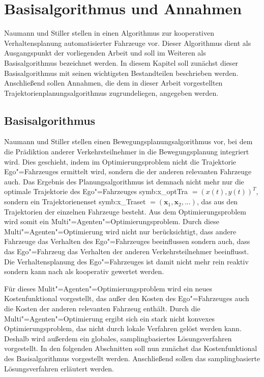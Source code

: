 
\chapter{Basisalgorithmus und Annahmen}
\label{sec:underlying-conditions_preliminaries}
Naumann und Stiller stellen in \cite{Naumann2017towards} einen Algorithmus zur kooperativen Verhaltensplanung automatisierter Fahrzeuge vor.
Dieser Algorithmus dient als Ausgangspunkt der vorliegenden Arbeit und soll im Weiteren als Basisalgorithmus bezeichnet werden.
In diesem Kapitel soll zun\"achst dieser Basisalgorithmus mit seinen wichtigsten Bestandteilen beschrieben werden.
Anschlie{\ss}end sollen Annahmen, die dem in dieser Arbeit vorgestellten Trajektorienplanungsalgorithmus zugrundeliegen, angegeben werden.


\section{Basisalgorithmus}
Naumann und Stiller \cite{Naumann2017towards} stellen einen Bewegungsplanungsalgorithmus vor, bei dem die Pr\"adiktion anderer Verkehrsteilnehmer in die Bewegungsplanung integriert wird.
Dies geschieht, indem im Optimierungsproblem nicht die Trajektorie Ego"=Fahrzeuges ermittelt wird, sondern die der anderen relevanten Fahrzeuge auch.
Das Ergebnis des Planungsalgorithmus ist demnach nicht mehr nur die optimale Trajektorie des Ego"=Fahrzeuges \gls{symb:x_optTra} \( = (x(t), y(t))^T \), sondern ein Trajektorienenset \gls{symb:x_Traset} \(= (\pmb{x}_1, \pmb{x}_2, ...) \), das aus den Trajektorien der einzelnen Fahrzeuge besteht.
Aus dem Optimierungsproblem wird somit ein Multi"=Agenten"=Optimierungsproblem.
Durch diese Multi"=Agenten"=Optimierung wird nicht nur ber\"ucksichtigt, dass andere Fahrzeuge das Verhalten des Ego"=Fahrzeuges beeinflussen sondern auch, dass das Ego"=Fahrzeug das Verhalten der anderen Verkehrsteilnehmer beeinflusst.
Die Verhaltensplanung des Ego"=Fahrzeuges ist damit nicht mehr rein reaktiv sondern kann nach \cite{Naumann2017} als kooperativ gewertet werden.

F\"ur dieses Mulit"=Agenten"=Optimierungsproblem wird ein neues Kostenfunktional vorgestellt, das au{\ss}er den Kosten des Ego"=Fahrzeuges auch die Kosten der anderen relevanten Fahrzeug enth\"alt.
Durch die Multi"=Agenten"=Optimierung ergibt sich ein stark nicht konvexes Optimierungsproblem, das nicht durch lokale Verfahren gel\"ost werden kann. 
Deshalb wird au{\ss}erdem ein globales, samplingbasiertes L\"osungsverfahren vorgestellt.
In den folgenden Abschnitten soll nun zun\"achst das Kostenfunktional des Basisalgorithmus vorgestellt werden. 
Anschlie{\ss}end sollen das samplingbasierte L\"osungsverfahren erl\"autert werden.

